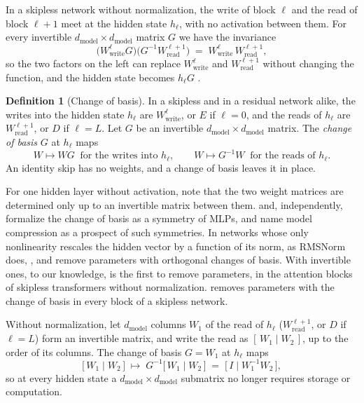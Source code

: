 \documentclass[10pt]{article}
\theoremstyle{definition}
\newtheorem{definition}[theorem]{Definition}
\theoremstyle{remark}
\newcommand{\Wread}{W_{\mathrm{read}}}
\newcommand{\Wwrite}{W_{\mathrm{write}}}
\newcommand{\dm}{d_{\mathrm{model}}}
\newcommand{\KDcob}{3.2}      %
\newcommand{\KDreduce}{3.3}   %
\begin{document}
In a skipless network without normalization, the write of block $\ell$ and the read of block $\ell+1$ meet at the hidden state $h_\ell$, with no activation between them. For every invertible $\dm\times\dm$ matrix $G$ we have the invariance
\begin{equation}\label{eq:invariance}
\big(\Wwrite^{\ell}G\big)\big(G^{-1}\Wread^{\ell+1}\big) \;=\; \Wwrite^{\ell}\,\Wread^{\ell+1},
\end{equation}
so the two factors on the left can replace $\Wwrite^{\ell}$ and $\Wread^{\ell+1}$ without changing the function, and the hidden state becomes $h_\ell G$ \citep[Proposition~\KDcob]{karbevski2026dimension}.

\begin{definition}[Change of basis]\label{def:cob}
In a skipless and in a residual network alike, the writes into the hidden state $h_\ell$ are $\Wwrite^{\ell}$, or $E$ if $\ell = 0$, and the reads of $h_\ell$ are $\Wread^{\ell+1}$, or $D$ if $\ell = L$. Let $G$ be an invertible $\dm\times\dm$ matrix. The \emph{change of basis} $G$ at $h_\ell$ maps
\begin{equation}\label{eq:cob}
W \mapsto WG \ \text{ for the writes into } h_\ell, \qquad W \mapsto G^{-1}W \ \text{ for the reads of } h_\ell.
\end{equation}
An identity skip has no weights, and a change of basis leaves it in place.
\end{definition}

For one hidden layer without activation, \citet{albertini1993uniqueness} note that the two weight matrices are determined only up to an invertible matrix between them. \citet{godfrey2022symmetries} and, independently, \citet{zhao2023symmetries} formalize the change of basis as a symmetry of MLPs, and \citet{zhao2023symmetries} name model compression as a prospect of such symmetries. In networks whose only nonlinearity rescales the hidden vector by a function of its norm, as RMSNorm does, \citet{ganev2021universal}, \citet{ganev2022quiver} and \citet{bird2026isotropic} remove parameters with orthogonal changes of basis. With invertible ones, to our knowledge, \citet{graef2024tricks} is the first to remove parameters, in the attention blocks of skipless transformers without normalization. \citet[Proposition~\KDreduce]{karbevski2026dimension} removes parameters with the change of basis in every block of a skipless network.

Without normalization, let $\dm$ columns $W_1$ of the read of $h_\ell$ ($\Wread^{\ell+1}$, or $D$ if $\ell = L$) form an invertible matrix, and write the read as $[\,W_1 \mid W_2\,]$, up to the order of its columns. The change of basis $G = W_1$ at $h_\ell$ maps
\begin{equation}\label{eq:skiplessstep}
\big[\,W_1 \mid W_2\,\big] \;\mapsto\; G^{-1}\big[\,W_1 \mid W_2\,\big] \;=\; \big[\,I \mid W_1^{-1}W_2\,\big],
\end{equation}
so at every hidden state a $\dm\times\dm$ submatrix no longer requires storage or computation.
\end{document}
